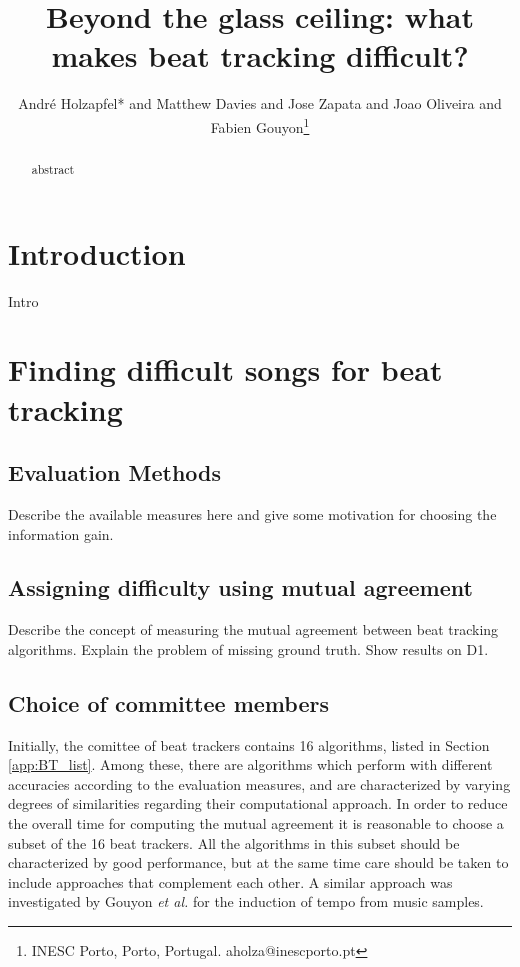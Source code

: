 \documentclass[10pt,journal,final,twocolumn,twoside]{IEEEtran}
\begin{document}
\title{Beyond the glass ceiling: what makes beat tracking difficult?} %

\author{Andr\'e Holzapfel* and Matthew Davies and Jose Zapata and Joao Oliveira and Fabien Gouyon\thanks{INESC Porto, Porto, Portugal. aholza@inescporto.pt}}


\maketitle
\setlength{\abovedisplayskip}{4pt}
\setlength{\belowdisplayskip}{4pt}
\setlength{\abovedisplayshortskip}{4pt}
\setlength{\belowdisplayshortskip}{4pt}
\setlength{\belowcaptionskip}{-5pt}
\begin{abstract}
abstract
\end{abstract}

\section{Introduction}
Intro

\section{Finding difficult songs for beat tracking}
\subsection{Evaluation Methods}
Describe the available measures here and give some motivation for choosing the information gain.
\subsection{Assigning difficulty using mutual agreement}
Describe the concept of measuring the mutual agreement between beat tracking algorithms. Explain the problem of missing ground truth. Show results on D1.
\subsection{Choice of committee members}
Initially, the comittee of beat trackers contains 16 algorithms, listed in Section \ref{app:BT_list}. Among these, there are algorithms which perform with different accuracies according to the evaluation measures, and are characterized by varying degrees of similarities regarding their computational approach. In order to reduce the overall time for computing the mutual agreement it is reasonable to choose a subset of the 16 beat trackers. All the algorithms in this subset should be characterized by good performance, but at the same time care should be taken to include approaches that complement each other. A similar approach was investigated by Gouyon \textit{et al.} \cite{Gouyon06Comparison} for the induction of tempo from music samples.
\end{document}
